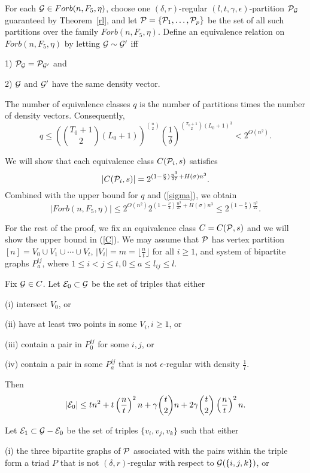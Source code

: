 \documentclass[11pt]{article}
\begin{document}
For each ${{\cal G}} \in
Forb(n, F_5, \eta)$, choose one $(\delta, r)$-regular $(l, t,
\gamma, \epsilon)$-partition ${\cal P}_{{{\cal G}}}$ guaranteed by
Theorem~\ref{rl}, and let ${\cal P}=\{{\cal P}_1, \ldots, {\cal P}_p\}$ be the set
of all such partitions over the family $Forb(n, F_5, \eta)$.
Define
an equivalence relation on $Forb(n, F_5, \eta)$ by letting ${{\cal G}}\sim
{{\cal G}}'$ iff

1) ${\cal P}_{{{\cal G}}}={\cal P}_{{{\cal G}}'}$ and

2) ${{\cal G}}$ and ${{\cal G}}'$ have the same density vector.

The number of equivalence classes $q$ is the number of partitions
times the number of  density vectors.  Consequently,
$$q\le \left({T_0 +1\choose 2}(L_0+1)\right)^{n \choose 2}
\left(\frac{1}{\delta}\right)^{{T_0+1 \choose 2}(L_0+1)^3}<2^{O(n^2)}.$$

We will show that each equivalence class $C({\cal P}_i, s)$ satisfies
\begin{equation} \label{C} |C(\cP_i, s)|=2^{(1-\frac{\nu}{2})\frac{n^3}{27}+H(\sigma)n^3}.
\end{equation}
Combined with the upper bound for $q$ and (\ref{sigma}), we obtain
$$|Forb(n, F_5, \eta)|\le 2^{O(n^2)}2^{(1-\frac{\nu}{2})\frac{n^3}{27}+H(\sigma)n^3}\le
2^{(1-\frac{\nu}{3})\frac{n^3}{27}}.$$

For the rest of the proof, we fix an equivalence class $C=C({\cal P}, s)$ and we will show the upper bound in (\ref{C}).
 We may assume that ${\cal P}$ has vertex partition
  $[n]=V_0\cup V_1\cup \cdots \cup V_t$, $|V_i|=m=\lfloor \frac{n}{t}\rfloor$ for all $i\ge 1$,
  and system of bipartite graphs $P_{a}^{ij}$, where $1\le i<j\le t, 0\le a\le l_{ij} \le l$.

 Fix ${{\cal G}} \in C$.  Let ${\cal E}_0\subset {{\cal G}}$ be the set of triples that either

 (i) intersect $V_0$, or

 (ii) have at least two points in some
$V_i, i\ge 1$, or

 (iii) contain a pair in $P_0^{ij}$ for some $i,j$, or

 (iv) contain a pair in some $P_{a}^{ij}$ that is not $\epsilon$-regular with density $\frac1l$.

 Then
 $$|{\cal E}_0|\le tn^2+t\left(\frac{n}{t}\right)^2 n +\gamma{t \choose 2}n+2\gamma{t \choose 2}\left(\frac{n}{t}\right)^2 n.$$

  Let ${\cal E}_1 \subset {{\cal G}}-{\cal E}_0$ be the set of triples $\{v_i, v_j, v_k\}$ such that either

  (i) the three bipartite graphs of ${\cal P}$  associated with the pairs within the triple form
  a triad $P$ that is not $(\delta, r)$-regular with respect to ${{\cal G}}(\{i,j,k\})$, or
\end{document}
